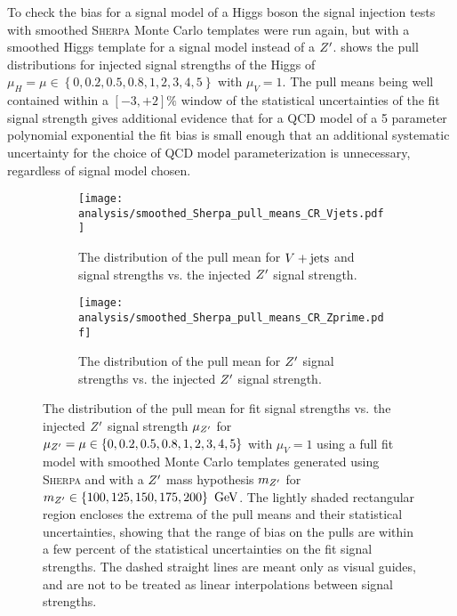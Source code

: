 To check the bias for a signal model of a Higgs boson the signal injection tests with smoothed \textsc{Sherpa} Monte Carlo templates were run again, but with a smoothed Higgs template for a signal model instead of a $\Zprime$.
 shows the pull distributions for injected signal strengths of the Higgs of $\mu_{H} = \mu \in \left\{0, 0.2, 0.5, 0.8, 1, 2, 3, 4, 5\right\}$ with $\mu_{V} = 1$.
The pull means being well contained within a $\left[-3,+2\right]\%$ window of the statistical uncertainties of the fit signal strength gives additional evidence that for a QCD model of a 5 parameter polynomial exponential the fit bias is small enough that an additional systematic uncertainty for the choice of QCD model parameterization is unnecessary, regardless of signal model chosen.

\begin{figure}[htbp]
 \centering
 \begin{subfigure}[t]{0.48\textwidth}
  \centering
  \texttt{[image: analysis/smoothed\_Sherpa\_pull\_means\_CR\_Vjets.pdf]}
  \caption[The distribution of the pull mean for $\Vjets$ and signal strengths vs. the injected $\Zprime$ signal strength.]{%
   The distribution of the pull mean for $\Vjets$ and signal strengths vs. the injected $\Zprime$ signal strength.}
  \label{fig:pulls_Vjets_Sherpa}
 \end{subfigure}%
 \quad
 \begin{subfigure}[t]{0.48\textwidth}
  \centering
  \texttt{[image: analysis/smoothed\_Sherpa\_pull\_means\_CR\_Zprime.pdf]}
  \caption[The distribution of the pull mean for $\Zprime$ signal strengths vs. the injected $\Zprime$ signal strength.]{%
   The distribution of the pull mean for $\Zprime$ signal strengths vs. the injected $\Zprime$ signal strength.}
  \label{fig:pulls_Zprime_Sherpa}
 \end{subfigure}
 \caption[The distribution of the pull mean for fit signal strengths vs. the injected $\Zprime$ signal strength with \textsc{Sherpa} Monte Carlo templates.]{%
  The distribution of the pull mean for fit signal strengths vs. the injected $\Zprime$ signal strength $\mu_{Z^{\prime}}$ for $\mu_{Z^{\prime}} = \mu \in \left\{0, 0.2, 0.5, 0.8, 1, 2, 3, 4, 5\right\}$ with $\mu_{V} = 1$ using a full fit model with smoothed Monte Carlo templates generated using \textsc{Sherpa} and with a $\Zprime$ mass hypothesis $m_{Z^{\prime}}$ for
  $m_{Z^{\prime}} \in \left\{100, 125, 150, 175, 200\right\}~\mathrm{GeV}$.
  The lightly shaded rectangular region encloses the extrema of the pull means and their statistical uncertainties, showing that the range of bias on the pulls are within a few percent of the statistical uncertainties on the fit signal strengths.
  The dashed straight lines are meant only as visual guides, and are not to be treated as linear interpolations between signal strengths.}
 \label{fig:pulls_summary_smoothed_Sherpa}
\end{figure}

